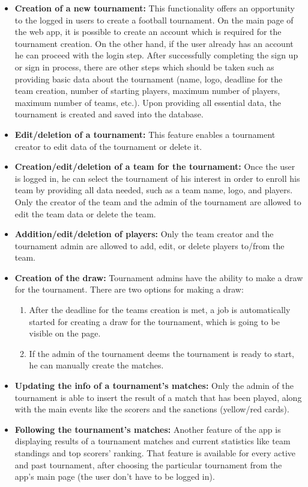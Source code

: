 \begin{itemize}
    \item \textbf{Creation of a new tournament:}
        This functionality offers an opportunity to the logged in users to create a football tournament. On the main page of the web app, it is possible to create an account which is required for the tournament creation. On the other hand, if the user already has an account he can proceed with the login step. After successfully completing the sign up or sign in process, there are other steps which should be taken such as providing basic data about the tournament (name, logo, deadline for the team creation, number of starting players, maximum number of players, maximum number of teams, etc.). Upon providing all essential data, the tournament is created and saved into the database.

        \item \textbf{Edit/deletion of a tournament:}
        This feature enables a tournament creator to edit data of the tournament or delete it.

    \item \textbf{Creation/edit/deletion of a team for the tournament:}
        Once the user is logged in, he can select the tournament of his interest in order to enroll his team by providing all data needed, such as a team name, logo, and players. Only the creator of the team and the admin of the tournament are allowed to edit the team data or delete the team.

    \item \textbf{Addition/edit/deletion of players:}
        Only the team creator and the tournament admin are allowed to add, edit, or delete players to/from the team.

    \item \textbf{Creation of the draw:}
        Tournament admins have the ability to make a draw for the tournament. There are two options for making a draw:
        \begin{enumerate}
            \item After the deadline for the teams creation is met, a job is automatically started for creating a draw for the tournament, which is going to be visible on the page.
            \item If the admin of the tournament deems the tournament is ready to start, he can manually create the matches.
        \end{enumerate}

    \item \textbf{Updating the info of a tournament's matches:}
        Only the admin of the tournament is able to insert the result of a match that has been played, along with the main events like the scorers and the sanctions (yellow/red cards).

    \item \textbf{Following the tournament's matches:}
        Another feature of the app is displaying results of a tournament matches and current statistics like team standings and top scorers' ranking. That feature is available for every active and past tournament, after choosing the particular tournament from the app's main page (the user don't have to be logged in).

\end{itemize}
\newpage